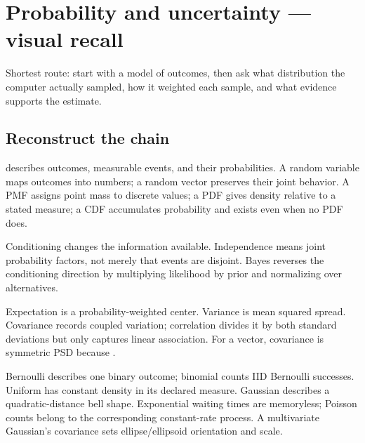 \hypertarget{appendix-cb5af353ef77}{}\label{referencestart:appendix-cb5af353ef77}
\section{Probability and uncertainty --- visual recall}\label{appendix-cb5af353ef77-probability-and-uncertainty-visual-recall}

\hypertarget{appendix-cb5af353ef77-probability-and-uncertainty-visual-recall}{}


Shortest route: start with a model of outcomes, then ask what distribution the computer actually sampled, how it weighted each sample, and what evidence supports the estimate.

\subsection{Reconstruct the chain}\label{appendix-cb5af353ef77-reconstruct-the-chain}

\hypertarget{appendix-cb5af353ef77-reconstruct-the-chain}{}

 describes outcomes, measurable events, and their probabilities. A random variable maps outcomes into numbers; a random vector preserves their joint behavior. A PMF assigns point mass to discrete values; a PDF gives density relative to a stated measure; a CDF accumulates probability and exists even when no PDF does.

Conditioning changes the information available. Independence means joint probability factors, not merely that events are disjoint. Bayes reverses the conditioning direction by multiplying likelihood by prior and normalizing over alternatives.

Expectation is a probability-weighted center. Variance is mean squared spread. Covariance records coupled variation; correlation divides it by both standard deviations but only captures linear association. For a vector, covariance is symmetric PSD because .

Bernoulli describes one binary outcome; binomial counts IID Bernoulli successes. Uniform has constant density in its declared measure. Gaussian describes a quadratic-distance bell shape. Exponential waiting times are memoryless; Poisson counts belong to the corresponding constant-rate process. A multivariate Gaussian's covariance sets ellipse/ellipsoid orientation and scale.

